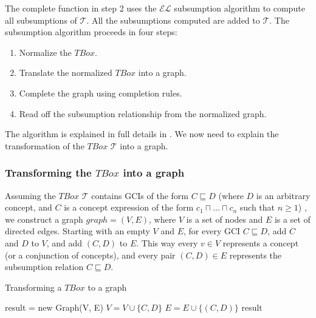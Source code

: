 The complete function in step 2 uses the $\mathcal{EL}$ subsumption algorithm to compute all subsumptions of $\mathcal{T}$. All the subsumptions computed are added to $\mathcal{T}$. The subsumption algorithm proceeds in four steps:\cite{new}
\begin{enumerate}
\item Normalize the $TBox$.
\item Translate the normalized $TBox$ into a graph.
\item Complete the graph using completion rules.
\item Read off the subsumption relationship from the normalized graph.
\end{enumerate}
The algorithm is explained in full details in \cite{new}. We now need to explain the transformation of the $TBox$ $\mathcal{T}$ into a graph.

\subsubsection{Transforming the $TBox$ into a graph}
Assuming the $TBox$ $\mathcal{T}$ contains GCIs of the form $C \sqsubseteq D$ (where $D$ is an arbitrary concept, and $C$ is a concept expression of the form $c_1 \sqcap ... \sqcap c_n$ such that $n \geq 1$) , we construct a graph $graph=(V, E)$, where $V$ is a set of nodes and $E$ is a set of directed edges. Starting with an empty $V$ and $E$, for every GCI $C \sqsubseteq D$, add $C$ and $D$ to $V$, and add $(C, D)$ to $E$. This way every $v \in V$ represents a concept (or a conjunction of concepts), and every pair $(C, D) \in E$ represents the subsumption relation $C \sqsubseteq D$.

\begin{algorithm}
\caption{Transforming a $TBox$ to a graph}
\label{Transformation}
\begin{algorithmic}[1]
\State result = new Graph(V, E)
\State $V = V \cup \{C, D\}$
\State $E = E \cup \{(C, D)\}$
\EndFor
\State \Return result
\EndFunction
\end{algorithmic}
\end{algorithm}

